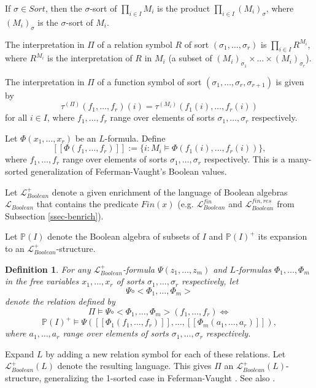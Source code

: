 \documentclass[12pt]{amsart}
\def\P{\mathbb{P}}
\def\cL{\mathcal{L}}
\def\cL{\mathcal{L}}
\newtheorem{Def}{Definition}[section]
\numberwithin{equation}{section}
\begin{document}
If $\sigma \in Sort$, then the $\sigma$-sort of 
$\prod_{i\in I} M_i$ is the product $\prod_{i\in I} (M_i)_{\sigma}$, where $(M_i)_{\sigma}$ is the $\sigma$-sort of $M_i$. 

The interpretation in $\Pi$ of a relation symbol $R$ of sort $(\sigma_1,\dots,\sigma_r)$ is $\prod_{i\in I} R^{M_i}$, where 
$R^{M_i}$ is the interpretation of $R$ in $M_i$ (a subset of $(M_i)_{\sigma_1}\times \dots \times (M_i)_{\sigma_r}$). 

The interpretation in $\Pi$ of a function symbol of sort $(\sigma_1,\dots,\sigma_r,\sigma_{r+1})$ is given by 
$$\tau^{(\Pi)}(f_{1},\dots,f_{r})(i)=
\tau^{(M_i)}(f_{1}(i),\dots,f_{r}(i))$$
for all $i\in I$, where $f_1,\dots,f_r$ range over elements of sorts $\sigma_1,\dots,\sigma_r$ respectively.

Let $\Phi(x_{1},\dots,x_{r})$ be an $L$-formula. Define 
$$[[\Phi(f_{1},\dots,f_{r})]]:=
\{i: M_i \models \Phi(f_{1}(i),\dots,f_{r}(i))\},$$
where $f_1,\dots,f_r$ range over elements of sorts $\sigma_1,\dots,\sigma_r$ respectively. This is 
a many-sorted generalization of Feferman-Vaught's Boolean values. 


Let $\cL_{Boolean}^{+}$ denote a given enrichment of the language of Boolean algebras $\cL_{Boolean}$ that contains the predicate $Fin(x)$ (e.g. $\cL_{Boolean}^{fin}$ and $\cL_{Boolean}^{fin,res}$ from Subsection \ref{ssec-benrich}). 

Let $\P(I)$ denote the Boolean algebra of subsets of $I$ and $\P(I)^+$ its expansion to an $\cL_{Boolean}^+$-structure. 
\begin{Def} For any $\mathcal{L}_{Boolean}^{+}$-formula $\Psi(z_1,\dots,z_m)$ and $L$-formulas $\Phi_1,\dots,\Phi_m$ in the free 
variables $x_{1},\dots,x_{r}$ of sorts $\sigma_1,\dots,\sigma_r$ respectively, 
let 
$$\Psi \circ < \Phi_1,\dots,\Phi_m>$$ denote the relation defined by 
$$\Pi \models \Psi \circ<\Phi_1,\dots, \Phi_m>(f_{1},\dots,f_{r}) \Leftrightarrow$$ 
$$\P(I)^+\models \Psi([[\Phi_1(f_{1},\dots,f_{r})]],\dots,
[[\Phi_m(a_{1},\dots,a_{r})]]),$$
where $a_1,\dots,a_r$ range over elements of sorts $\sigma_1,\dots,\sigma_r$ respectively.\end{Def}

Expand $L$ by adding a new relation symbol for each of these relations. Let $\cL_{Boolean}^{+}(L)$ denote the resulting language. This gives 
$\Pi$ an $\cL_{Boolean}^{+}(L)$-structure, generalizing the 1-sorted case in Feferman-Vaught \cite{FV}. See also \cite{DM-supp}.
\end{document}
